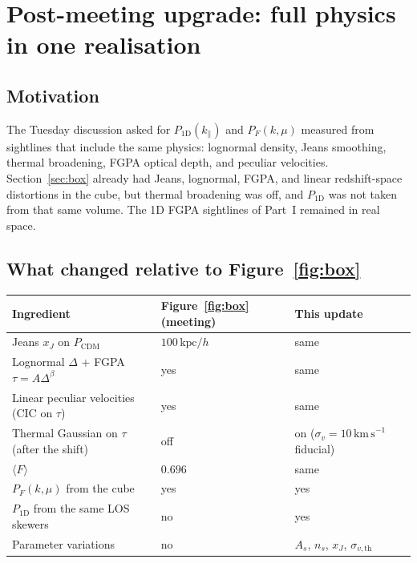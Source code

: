 %

\section{Post-meeting upgrade: full physics in one realisation}
\label{sec:fullphysics}

\subsection{Motivation}

The Tuesday discussion asked for $P_{1\mathrm{D}}(k_\parallel)$ and $P_F(k,\mu)$ measured from sightlines that include the same physics: lognormal density, Jeans smoothing, thermal broadening, FGPA optical depth, and peculiar velocities.
Section~\ref{sec:box} already had Jeans, lognormal, FGPA, and linear redshift-space distortions in the cube, but thermal broadening was off, and $P_{1\mathrm{D}}$ was not taken from that same volume.
The 1D FGPA sightlines of Part~I remained in real space.

\subsection{What changed relative to Figure~\ref{fig:box}}

\begin{center}
\small
\begin{tabular}{@{}lll@{}}
\toprule
Ingredient & Figure~\ref{fig:box} (meeting) & This update \\
\midrule
Jeans $x_J$ on $P_\mathrm{CDM}$ & $100\,\mathrm{kpc}/h$ & same \\
Lognormal $\Delta$ + FGPA $\tau=A\Delta^{\beta}$ & yes & same \\
Linear peculiar velocities (CIC on $\tau$) & yes & same \\
Thermal Gaussian on $\tau$ (after the shift) & off & on ($\sigma_v=10\,\mathrm{km\,s}^{-1}$ fiducial) \\
$\langle F\rangle$ & $0.696$ & same \\
$P_F(k,\mu)$ from the cube & yes & yes \\
$P_{1\mathrm{D}}$ from the same LOS skewers & no & yes \\
Parameter variations & no & $A_s$, $n_s$, $x_J$, $\sigma_{v,\mathrm{th}}$ \\
\bottomrule
\end{tabular}
\end{center}

